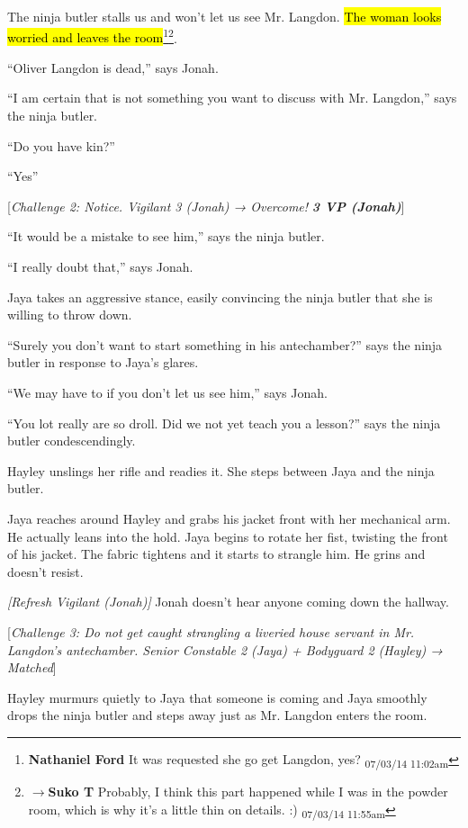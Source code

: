 The ninja butler stalls us and won't let us see Mr. Langdon.  \hl{The woman looks worried and leaves the room}\footnote{\textbf{Nathaniel Ford }It was requested she go get Langdon, yes? \textsubscript{07/03/14 11:02am}}\footnote{$\rightarrow$\textbf{Suko T }Probably, I think this part happened while I was in the powder room, which is why it's a little thin on details. :) \textsubscript{07/03/14 11:55am}}.  

``Oliver Langdon is dead,'' says Jonah.

``I am certain that is not something you want to discuss with Mr. Langdon,'' says the ninja butler.

``Do you have kin?''

``Yes''

{[}\textit{Challenge 2: Notice. Vigilant 3 (Jonah) → Overcome! }\textit{\textbf{3 VP (Jonah)}}{]} 

``It would be a mistake to see him,'' says the ninja butler.

``I really doubt that,'' says Jonah.

Jaya takes an aggressive stance, easily convincing the ninja butler that she is willing to throw down.

``Surely you don't want to start something in his antechamber?'' says the ninja butler in response to Jaya's glares.

``We may have to if you don't let us see him,'' says Jonah.

``You lot really are so droll.  Did we not yet teach you a lesson?'' says the ninja butler condescendingly.

Hayley unslings her rifle and readies it.  She steps between Jaya and the ninja butler.

Jaya reaches around Hayley and grabs his jacket front with her mechanical arm.  He actually leans into the hold.  Jaya begins to rotate her fist, twisting the front of his jacket.  The fabric tightens and it starts to strangle him.  He grins and doesn't resist.

\textit{{[}Refresh Vigilant (Jonah){]}}  Jonah doesn't hear anyone coming down the hallway.

{[}\textit{Challenge 3: Do not get caught strangling a liveried house servant in Mr. Langdon's antechamber. Senior Constable 2 (Jaya) + Bodyguard 2 (Hayley) → Matched}{]} 

Hayley murmurs quietly to Jaya that someone is coming and Jaya smoothly drops the ninja butler and steps away just as Mr. Langdon enters the room.

